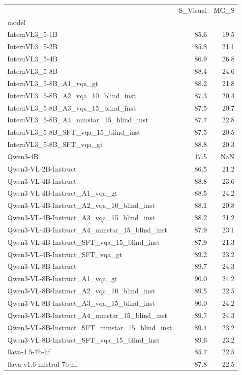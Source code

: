 \begin{tabular}{lrr}
\toprule
 & S_Visual & MG_S \\
model &  &  \\
\midrule
InternVL3_5-1B & 85.6 & 19.5 \\
InternVL3_5-2B & 85.8 & 21.1 \\
InternVL3_5-4B & 86.9 & 26.8 \\
InternVL3_5-8B & 88.4 & 24.6 \\
InternVL3_5-8B_A1_vqa_gt & 88.2 & 21.8 \\
InternVL3_5-8B_A2_vqa_10_blind_inst & 87.3 & 20.4 \\
InternVL3_5-8B_A3_vqa_15_blind_inst & 87.5 & 20.7 \\
InternVL3_5-8B_A4_mmstar_15_blind_inst & 87.7 & 22.8 \\
InternVL3_5-8B_SFT_vqa_15_blind_inst & 87.5 & 20.5 \\
InternVL3_5-8B_SFT_vqa_gt & 88.8 & 20.3 \\
Qwen3-4B & 17.5 & NaN \\
Qwen3-VL-2B-Instruct & 86.5 & 21.2 \\
Qwen3-VL-4B-Instruct & 88.8 & 23.6 \\
Qwen3-VL-4B-Instruct_A1_vqa_gt & 88.5 & 24.2 \\
Qwen3-VL-4B-Instruct_A2_vqa_10_blind_inst & 88.1 & 20.8 \\
Qwen3-VL-4B-Instruct_A3_vqa_15_blind_inst & 88.2 & 21.2 \\
Qwen3-VL-4B-Instruct_A4_mmstar_15_blind_inst & 87.9 & 23.1 \\
Qwen3-VL-4B-Instruct_SFT_vqa_15_blind_inst & 87.9 & 21.3 \\
Qwen3-VL-4B-Instruct_SFT_vqa_gt & 89.2 & 23.2 \\
Qwen3-VL-8B-Instruct & 89.7 & 24.3 \\
Qwen3-VL-8B-Instruct_A1_vqa_gt & 90.0 & 24.2 \\
Qwen3-VL-8B-Instruct_A2_vqa_10_blind_inst & 89.5 & 22.5 \\
Qwen3-VL-8B-Instruct_A3_vqa_15_blind_inst & 90.0 & 24.2 \\
Qwen3-VL-8B-Instruct_A4_mmstar_15_blind_inst & 89.7 & 24.3 \\
Qwen3-VL-8B-Instruct_SFT_mmstar_15_blind_inst & 89.4 & 23.2 \\
Qwen3-VL-8B-Instruct_SFT_vqa_15_blind_inst & 89.6 & 23.2 \\
llava-1.5-7b-hf & 85.7 & 22.5 \\
llava-v1.6-mistral-7b-hf & 87.8 & 22.5 \\

\end{tabular}
